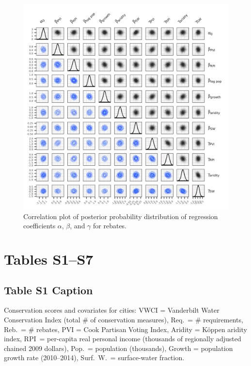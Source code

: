 \documentclass[draft]{agujournal}
\begin{document}
\begin{figure}
\includegraphics[width=6.25in]{figures_si/reb_pairs_plot-1} \caption[Correlation plot of posterior probability distribution of regression coefficients $\alpha$, $\beta$, and $\gamma$ for rebates]{Correlation plot of posterior probability distribution of regression coefficients $\alpha$, $\beta$, and $\gamma$ for rebates.}\label{fig:reb_pairs_plot}
\end{figure}



\clearpage
\section{Tables S1--S7}
\subsection*{Table S1 Caption}
\begin{table}[H]
\centering
\caption{Conservation scores and covariates for  cities: VWCI = Vanderbilt Water Conservation Index (total \# of conservation measures), Req.\ = \# requirements, Reb.\ = \# rebates, PVI = Cook Partisan Voting Index, Aridity = K\"oppen aridity index, RPI\ = per-capita real personal income (thousands of regionally adjusted chained 2009 dollars), Pop.\ = population (thousands), Growth = population growth rate (2010--2014), Surf.\ W.\ = surface-water fraction.}
\label{tab:vwci}
\end{table}
\end{document}

